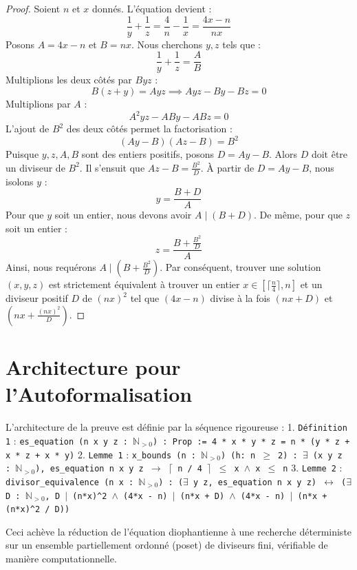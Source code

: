 \documentclass[12pt,a4paper]{article}
\begin{document}
\begin{proof}
Soient $n$ et $x$ donnés. L'équation devient :
\begin{equation}
\frac{1}{y} + \frac{1}{z} = \frac{4}{n} - \frac{1}{x} = \frac{4x - n}{nx}
\end{equation}
Posons $A = 4x - n$ et $B = nx$. Nous cherchons $y, z$ tels que :
\begin{equation}
\frac{1}{y} + \frac{1}{z} = \frac{A}{B}
\end{equation}
Multiplions les deux côtés par $Byz$ :
\begin{equation}
B(z + y) = Ayz \implies Ayz - By - Bz = 0
\end{equation}
Multiplions par $A$ :
\begin{equation}
A^2 y z - AB y - AB z = 0
\end{equation}
L'ajout de $B^2$ des deux côtés permet la factorisation :
\begin{equation}
(Ay - B)(Az - B) = B^2
\end{equation}
Puisque $y, z, A, B$ sont des entiers positifs, posons $D = Ay - B$. Alors $D$ doit être un diviseur de $B^2$. Il s'ensuit que $Az - B = \frac{B^2}{D}$.
À partir de $D = Ay - B$, nous isolons $y$ :
\begin{equation}
y = \frac{B + D}{A}
\end{equation}
Pour que $y$ soit un entier, nous devons avoir $A \mid (B + D)$.
De même, pour que $z$ soit un entier :
\begin{equation}
z = \frac{B + \frac{B^2}{D}}{A}
\end{equation}
Ainsi, nous requérons $A \mid (B + \frac{B^2}{D})$.
Par conséquent, trouver une solution $(x,y,z)$ est strictement équivalent à trouver un entier $x \in [\lceil \frac{n}{4} \rceil, n]$ et un diviseur positif $D$ de $(nx)^2$ tel que $(4x - n)$ divise à la fois $(nx + D)$ et $(nx + \frac{(nx)^2}{D})$.
\end{proof}

\section{Architecture pour l'Autoformalisation}
L'architecture de la preuve est définie par la séquence rigoureuse :
1. \texttt{Définition 1} : \texttt{es\_equation (n x y z : \(\mathbb{N}_{>0}\)) : Prop := 4 * x * y * z = n * (y * z + x * z + x * y)}
2. \texttt{Lemme 1} : \texttt{x\_bounds (n : \(\mathbb{N}_{>0}\)) (h: n \(\geq\) 2) : \(\exists\) (x y z : \(\mathbb{N}_{>0}\)), es\_equation n x y z \(\to\) \(\lceil\) n / 4 \(\rceil\) \(\leq\) x \(\land\) x \(\leq\) n}
3. \texttt{Lemme 2} : \texttt{divisor\_equivalence (n x : \(\mathbb{N}_{>0}\)) : (\(\exists\) y z, es\_equation n x y z) \(\leftrightarrow\) (\(\exists\) D : \(\mathbb{N}_{>0}\), D \(\mid\) (n*x)\textasciicircum 2 \(\land\) (4*x - n) \(\mid\) (n*x + D) \(\land\) (4*x - n) \(\mid\) (n*x + (n*x)\textasciicircum 2 / D))}

Ceci achève la réduction de l'équation diophantienne à une recherche déterministe sur un ensemble partiellement ordonné (poset) de diviseurs fini, vérifiable de manière computationnelle.
\end{document}
